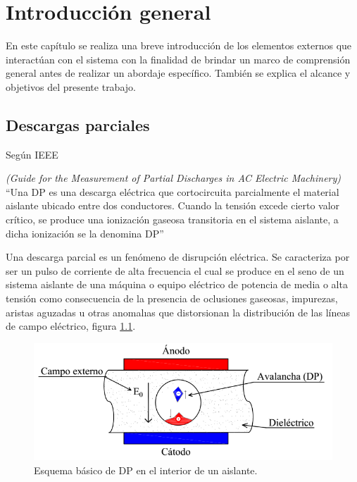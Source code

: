 
\chapter{Introducción general} %

\label{Chapter1} %
\label{IntroGeneral}
En este capítulo se realiza una breve introducción de los elementos externos que interactúan con el sistema con la finalidad de brindar un marco de comprensión general antes de realizar un abordaje específico. También se explica el alcance y objetivos del presente trabajo.


\newcommand{\keyword}[1]{\textbf{#1}}
\newcommand{\tabhead}[1]{\textbf{#1}}
\newcommand{\code}[1]{\texttt{#1}}
\newcommand{\file}[1]{\texttt{\bfseries#1}}
\newcommand{\option}[1]{\texttt{\itshape#1}}
\newcommand{\grados}{$^{\circ}$}

\section{Descargas parciales}
Según IEEE

\textit{(Guide for the Measurement of Partial Discharges in AC Electric Machinery)}
\enquote{Una DP es una descarga eléctrica que cortocircuita parcialmente el material aislante ubicado entre dos conductores. Cuando la tensión excede cierto valor crítico, se produce una ionización gaseosa transitoria en el sistema aislante, a dicha ionización se la denomina DP} \citep{IEEE:citation}

Una descarga parcial es un fenómeno de disrupción eléctrica. Se caracteriza por ser un pulso de corriente de alta frecuencia el cual se produce en el seno de un sistema aislante de una máquina o equipo eléctrico de potencia de media o alta tensión como consecuencia de la presencia de  oclusiones gaseosas, impurezas, aristas aguzadas u otras anomalıas que distorsionan la distribución de las líneas de campo eléctrico, figura \ref{fig:basicoDp}.

\begin{figure}[ht]
	\centering
	\includegraphics[width=\textwidth]{./Figures/basicoDp.png}
	\caption{Esquema básico de DP en el interior de un aislante.}
	\label{fig:basicoDp}
\end{figure}

